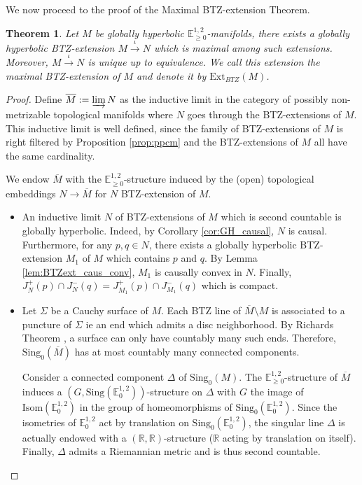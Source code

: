 \documentclass[a4paper,12pt]{article}
\def\isom{Isom}
\def\sing{\mathrm{Sing}}
\def\RR{\mathbb{R}}
\newcommand{\mass}[1]{{\mathbb E}^{1,2}_{#1}}
\def\isom{\mathrm{Isom}}
\newtheorem{theo}{Theorem}    %
\begin{document}
We now proceed to the proof of the Maximal BTZ-extension Theorem.
\setcounter{theo}{1}
 \begin{theo}\label{theo:BTZ_ext} Let $M$ be globally hyperbolic $\mass{\geq 0}$-manifolds, there exists a globally hyperbolic BTZ-extension $M\xrightarrow{\iota} N$ which is maximal among such extensions. Moreover, $M\xrightarrow{\iota}N$ is unique up to equivalence. We  call this extension
the maximal BTZ-extension of $M$ and denote it by 
  $\mathrm{Ext}_{BTZ}(M)$.   
\end{theo}

		\begin{proof}
			Define $\overline M:= \varinjlim N$ as the inductive limit \cite{MR1712872} in the category of possibly non-metrizable topological manifolds \cite{MR3244277} where $N$ goes through the BTZ-extensions of $M$. This inductive limit is well defined, since the family of BTZ-extensions of $M$ is right filtered by Proposition \ref{prop:ppcm} and the BTZ-extensions of $M$ all have the same cardinality. 
			
			We endow $\overline M$ with the $\mass{\geq0}$-structure induced by the (open) topological embeddings $N\rightarrow \overline M$ for $N$ BTZ-extension of $M$.
			
			\begin{itemize}
\item An inductive limit $N$ of BTZ-extensions of $M$ which is second countable is globally hyperbolic. Indeed, by Corollary \ref{cor:GH_causal}, $N$ is causal. Furthermore, for any $p,q \in N$, there exists a globally hyperbolic BTZ-extension $M_1$ of $M$  which contains $p$ and $q$. By Lemma \ref{lem:BTZext_caus_conv},  $M_1$ is causally convex in $N$. Finally, $J^+_{N}(p)\cap J^-_{N}(q) = J^+_{M_1}(p)\cap J^-_{M_1}(q) $ which is compact.			
			
				\item
					Let $\Sigma$ be a Cauchy surface of $M$. Each BTZ line of $\overline M\setminus M$ is associated to a puncture of $\Sigma$ ie an end which admits a disc neighborhood. By Richards Theorem \cite{MR143186}, a surface can only have countably many such ends. Therefore, $\sing_0(\overline M)$ has at most countably many connected components.		
				
				 Consider a connected component $\Delta$ of $\sing_0(M)$.  The $\mass{\geq 0}$-structure of $\overline M$ induces a $\left(G ,\sing(\mass{0}) \right)$-structure on $\Delta$ with $G$ the image of $\isom(\mass{0})$ in the group of homeomorphisms of $\sing_0(\mass{0})$. Since the isometries of $\mass{0}$ act by translation on $\sing_0(\mass{0})$, the singular line $\Delta$ is actually endowed with a $(\RR,\RR)$-structure ($\RR$ acting by translation on itself). 
				 Finally, $\Delta$ admits a Riemannian metric and is thus second countable. 
				 

\end{itemize}
\end{proof}
\end{document}
